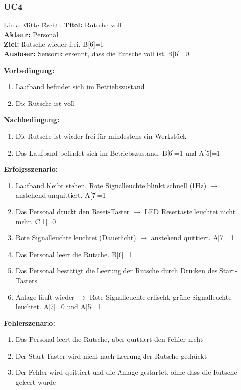 \documentclass[oneside,a4paper,titlepage]{scrartcl} %
\begin{document}
\subsubsection{UC4}
\begin{tabbing}
 Links \= Mitte \= Rechts \kill
 \textbf{Titel:} \> \> Rutsche voll\\
 \textbf{Akteur:} \> \> Personal\\
 \textbf{Ziel:} \> \> Rutsche wieder frei. B[6]=1\\
 \textbf{Auslöser:} \> \> Sensorik erkennt, dass die Rutsche voll ist. B[6]=0\\
\end{tabbing}
\textbf{Vorbedingung:}
\begin{enumerate}
 \item Laufband befindet sich im Betriebszustand
 \item Die Rutsche ist voll
\end{enumerate}
\textbf{Nachbedingung:}
\begin{enumerate}
 \item Die Rutsche ist wieder frei für mindestens ein Werkstück
 \item Das Laufband befindet sich im Betriebszustand. B[6]=1 und A[5]=1
\end{enumerate}
\textbf{Erfolgsszenario:}
\begin{enumerate}
 \item Laufband bleibt stehen. Rote Signalleuchte blinkt schnell (1Hz) $\rightarrow$ anstehend unquittiert. A[7]=1
 \item Das Personal drückt den Reset-Taster $\rightarrow$ LED Resettaste leuchtet nicht mehr. C[1]=0
 \item Rote Signalleuchte leuchtet (Dauerlicht) $\rightarrow$ anstehend quittiert. A[7]=1
 \item Das Personal leert die Rutsche. B[6]=1
 \item Das Personal bestätigt die Leerung der Rutsche durch Drücken des Start-Tasters
 \item Anlage läuft wieder $\rightarrow$ Rote Signalleuchte erlischt, grüne Signalleuchte leuchtet. A[7]=0 und A[5]=1
\end{enumerate}
\textbf{Fehlerszenario:}
\begin{enumerate}
 \item Das Personal leert die Rutsche, aber quittiert den Fehler nicht
 \item Der Start-Taster wird nicht nach Leerung der Rutsche gedrückt
 \item Der Fehler wird quittiert und die Anlage gestartet, ohne dass die Rutsche geleert wurde
\end{enumerate}
\end{document}
